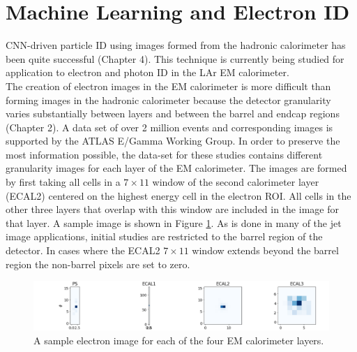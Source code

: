 \section{Machine Learning and Electron ID\label{ml_id}}
CNN-driven particle ID using images formed from the hadronic calorimeter has been quite successful (Chapter 4). This technique is currently being studied for application to electron and photon ID in the LAr EM calorimeter.\\

The creation of electron images in the EM calorimeter is more difficult than forming images in the hadronic calorimeter because the detector granularity varies substantially between layers and between the barrel and endcap regions (Chapter 2). A data set of over 2 million events and corresponding images is supported by the ATLAS E/Gamma Working Group. In order to preserve the most information possible, the data-set for these studies contains different granularity images for each layer of the EM calorimeter. The images are formed by first taking all cells in a $7\times 11$ window of the second calorimeter layer (ECAL2) centered on the highest energy cell in the electron ROI. All cells in the other three layers that overlap with this window are included in the image for that layer. A sample image is shown in Figure \ref{fig:elec_imgs}. As is done in many of the jet image applications, initial studies are restricted to the barrel region of the detector. In cases where the ECAL2 $7\times11$ window extends beyond the barrel region the non-barrel pixels are set to zero.\\

\begin{figure}[htb!]
    \centering
    \includegraphics[width=6in]{figures/chapter5/regular_electron_imgs.png}
    \caption{A sample electron image for each of the four EM calorimeter layers.}
    \label{fig:elec_imgs}
\end{figure}


